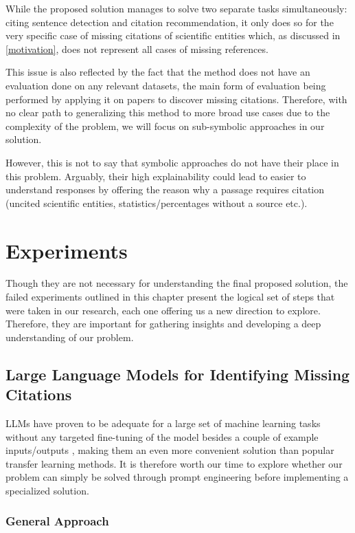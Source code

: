 \documentclass[12pt,a4paper]{report}
\begin{document}
While the proposed solution manages to solve two separate tasks simultaneously: citing sentence detection and citation recommendation, it only does so for the very specific case of missing citations of scientific entities which, as discussed in \autoref{motivation}, does not represent all cases of missing references.

This issue is also reflected by the fact that the method does not have an evaluation done on any relevant datasets, the main form of evaluation being performed by applying it on papers to discover missing citations. Therefore, with no clear path to generalizing this method to more broad use cases due to the complexity of the problem, we will focus on sub-symbolic approaches in our solution.

However, this is not to say that symbolic approaches do not have their place in this problem. Arguably, their high explainability could lead to easier to understand responses by offering the reason why a passage requires citation (uncited scientific entities, statistics/percentages without a source etc.).

\chapter{Experiments} \label{experiments}

Though they are not necessary for understanding the final proposed solution, the failed experiments outlined in this chapter present the logical set of steps that were taken in our research, each one offering us a new direction to explore. Therefore, they are important for gathering insights and developing a deep understanding of our problem.

\section{Large Language Models for Identifying Missing Citations}

LLMs have proven to be adequate for a large set of machine learning tasks without any targeted fine-tuning of the model besides a couple of example inputs/outputs \cite{brown2020languagemodelsfewshotlearners}, making them an even more convenient solution than popular transfer learning \cite{Raffel2019ExploringTL} methods. It is therefore worth our time to explore whether our problem can simply be solved through prompt engineering before implementing a specialized solution.

\subsection{General Approach}
\end{document}
